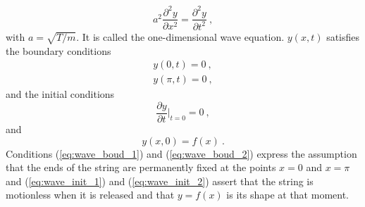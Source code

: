 \documentclass[12pt,a4paper]{article}
\begin{document}
\begin{equation}
a^2 \dfrac{\partial^2 y}{\partial x^2} = \dfrac{\partial^2 y}{\partial t^2} ~,
\label{eq:wave_equ}
\end{equation}
with $a = \sqrt{T/m}$. It is called the one-dimensional wave equation. $y(x,t)$ satisfies the boundary conditions
\begin{align}
y(0, t) = 0 ~, \label{eq:wave_boud_1} \\
y(\pi, t) = 0 ~, \label{eq:wave_boud_2}
\end{align}
and the initial conditions
\begin{equation}
\dfrac{\partial y}{\partial t}\Big|_{t=0} = 0 ~,
\label{eq:wave_init_1}
\end{equation}
and
\begin{equation}
y(x,0) = f(x) ~.
\label{eq:wave_init_2}
\end{equation}
Conditions (\ref{eq:wave_boud_1}) and (\ref{eq:wave_boud_2}) express the assumption that the ends of the string are permanently fixed at the points $x= 0$ and $x=\pi$ and (\ref{eq:wave_init_1}) and (\ref{eq:wave_init_2}) assert that the string is motionless when it is released and that $y=f(x)$ is its shape at that moment.
\end{document}
